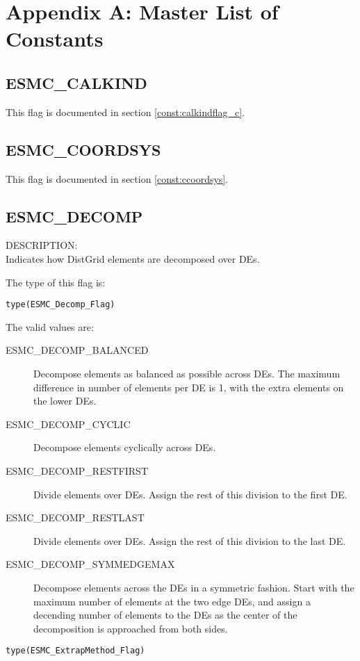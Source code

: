 
\section{Appendix A: Master List of Constants}
\label{const:cmaster}

\subsection{ESMC\_CALKIND}
This flag is documented in section \ref{const:calkindflag_c}.

\subsection{ESMC\_COORDSYS}
This flag is documented in section \ref{const:ccoordsys}.

\subsection{ESMC\_DECOMP}
\label{const:cdecompflag}
{\sf DESCRIPTION:\\}
Indicates how DistGrid elements are decomposed over DEs.

The type of this flag is:

{\tt type(ESMC\_Decomp\_Flag)}

The valid values are:
\begin{description}
\item [ESMC\_DECOMP\_BALANCED]
      Decompose elements as balanced as possible across DEs. The maximum 
      difference in number of elements per DE is 1, with the extra elements on
      the lower DEs.
\item [ESMC\_DECOMP\_CYCLIC]
      Decompose elements cyclically across DEs.
\item [ESMC\_DECOMP\_RESTFIRST]
      Divide elements over DEs. Assign the rest of this division to the first
      DE.
\item [ESMC\_DECOMP\_RESTLAST]
      Divide elements over DEs. Assign the rest of this division to the last DE.
\item [ESMC\_DECOMP\_SYMMEDGEMAX]
      Decompose elements across the DEs in a symmetric fashion. Start with the
      maximum number of elements at the two edge DEs, and assign a decending
      number of elements to the DEs as the center of the decomposition is 
      approached from both sides.
\end{description}

{\tt type(ESMC\_ExtrapMethod\_Flag)}
\label{opt:cextrapmethod}

